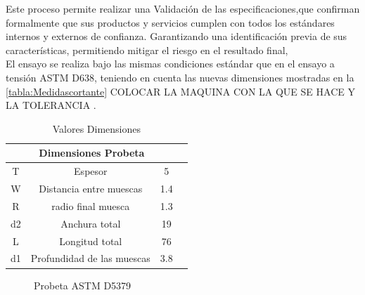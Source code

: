 Este proceso permite realizar una Validación de las especificaciones,que confirman formalmente que sus productos y servicios cumplen con todos los estándares internos y externos de confianza. Garantizando una identificación previa de sus características, permitiendo mitigar el riesgo en el resultado final,\\

El ensayo se realiza bajo las mismas condiciones estándar que en el ensayo a tensión \acrshort{ASTM} D638, teniendo en cuenta las nuevas dimensiones mostradas en la \autoref{tabla:Medidascortante} COLOCAR LA MAQUINA CON LA QUE SE HACE Y LA TOLERANCIA . 

\begin{table}[H]
\begin{center}
\begin{tabular}{c c c c}
\multicolumn{3}{c}{\textbf{Dimensiones Probeta}} \\
\toprule[0.6mm]
T & Espesor & 5 \\ 
W& Distancia entre muescas& 1.4 \\ 
R & radio final muesca &1.3 \\ 
d2 & Anchura total&19 \\ 
L& Longitud total &76 \\ 
d1 & Profundidad de las muescas &3.8  \\

\bottomrule[0.6mm]
\end{tabular}
\caption{Valores Dimensiones \citep{laureto}}
\label{tabla:Medidascortante}
\end{center}
\end{table}


\begin{figure}[H]
    \centering
    \caption{Probeta \acrshort{ASTM} D5379}
    \label{fig:cortante}
\end{figure}

